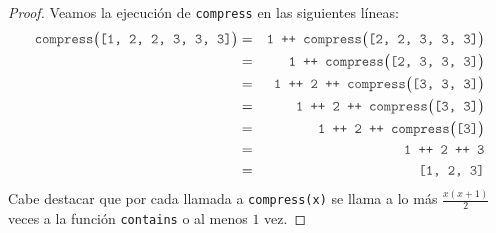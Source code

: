 \documentclass{article}
\newcommand{\code}[1]{\textcolor{white!25!black}{\texttt{#1}}}
\begin{document}
\begin{proof} Veamos la ejecución de \code{compress} en las siguientes líneas:
  \begin{eqnarray*}
    \code{compress}\big(\code{[1, 2, 2, 3, 3, 3]}\big)
    &=& \code{1 ++ compress}\big(\code{[2, 2, 3, 3, 3]}\big)\\
    &=& \code{1 ++ compress}\big(\code{[2, 3, 3, 3]}\big)\\
    &=& \code{1 ++ 2 ++ compress}\big(\code{[3, 3, 3]}\big)\\
    &=& \code{1 ++ 2 ++ compress}\big(\code{[3, 3]}\big)\\
    &=& \code{1 ++ 2 ++ compress}\big(\code{[3]}\big)\\
    &=& \code{1 ++ 2 ++ 3}\\
    &=& \code{[1, 2, 3]}
  \end{eqnarray*}
  Cabe destacar que por cada llamada a \code{compress(x)} se llama a lo más
  $\frac{x(x + 1)}{2}$ veces a la función \code{contains} o al menos $1$ vez.
\end{proof}
\end{document}
